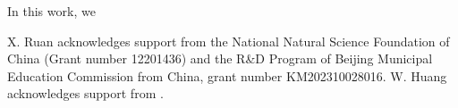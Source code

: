 \documentclass[11pt, dina4, amsfont12]{article}
\begin{document}
In this work, we 



\bigskip
{}  
X. Ruan acknowledges support  from the National Natural Science Foundation of China (Grant number 12201436) and the R\&D Program of Beijing Municipal Education Commission from China, grant number KM202310028016.
W. Huang acknowledges support  from . 



\end{document}
